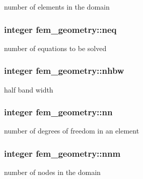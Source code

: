 number of elements in the domain 

\hypertarget{classfem__geometry_abccad0a217818ea3bfb8ae3774704842}{}
\subsubsection[{neq}]{\setlength{\rightskip}{0pt plus 5cm}integer fem\+\_\+geometry\+::neq}\label{classfem__geometry_abccad0a217818ea3bfb8ae3774704842}


number of equations to be solved 

\hypertarget{classfem__geometry_ab76fe1edb12c82677b620fdf4202cd58}{}
\subsubsection[{nhbw}]{\setlength{\rightskip}{0pt plus 5cm}integer fem\+\_\+geometry\+::nhbw}\label{classfem__geometry_ab76fe1edb12c82677b620fdf4202cd58}


half band width 

\hypertarget{classfem__geometry_a4c5fb53d974372ee3cb13d85dbd26800}{}
\subsubsection[{nn}]{\setlength{\rightskip}{0pt plus 5cm}integer fem\+\_\+geometry\+::nn}\label{classfem__geometry_a4c5fb53d974372ee3cb13d85dbd26800}


number of degrees of freedom in an element 

\hypertarget{classfem__geometry_a4c0e808cd5fe275c9614921b55877bec}{}
\subsubsection[{nnm}]{\setlength{\rightskip}{0pt plus 5cm}integer fem\+\_\+geometry\+::nnm}\label{classfem__geometry_a4c0e808cd5fe275c9614921b55877bec}


number of nodes in the domain 

\hypertarget{classfem__geometry_ae04fc7c0625da6808be910120c2ba8f5}{}

